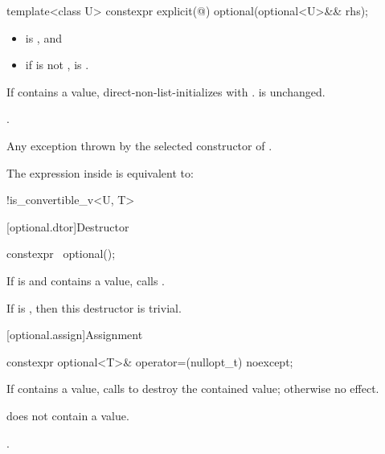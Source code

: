 %
\begin{itemdecl}
template<class U> constexpr explicit(@\seebelow@) optional(optional<U>&& rhs);
\end{itemdecl}

\begin{itemdescr}
\pnum
\constraints
\begin{itemize}
\item {} is , and
\item if  is not \cv{} ,
 is .
\end{itemize}

\pnum
\effects
If  contains a value,
direct-non-list-initializes 
with .
 is unchanged.

\pnum
\ensures
{}.

\pnum
\throws
Any exception thrown by the selected constructor of .

\pnum
\remarks
The expression inside  is equivalent to:
\begin{codeblock}
!is_convertible_v<U, T>
\end{codeblock}
\end{itemdescr}

[optional.dtor]{Destructor}

%
\begin{itemdecl}
constexpr ~optional();
\end{itemdecl}

\begin{itemdescr}
\pnum
\effects
If  is 
and  contains a value,
calls .

\pnum
\remarks
If  is , then this destructor is trivial.
\end{itemdescr}

[optional.assign]{Assignment}

%
\begin{itemdecl}
constexpr optional<T>& operator=(nullopt_t) noexcept;
\end{itemdecl}

\begin{itemdescr}
\pnum
\effects
If  contains a value, calls  to destroy the contained value; otherwise no effect.

\pnum
\ensures
{} does not contain a value.

\pnum
\returns
{}.
\end{itemdescr}

